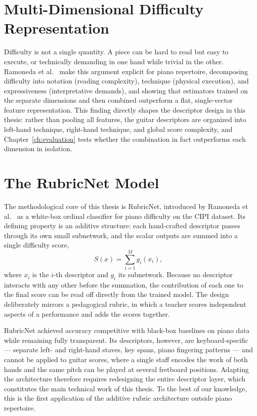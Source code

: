 \section{Multi-Dimensional Difficulty Representation}
Difficulty is not a single quantity. A piece can be hard to read but easy to execute, or technically demanding in one hand while trivial in the other. Ramoneda et al.~\cite{ramoneda2024combining} make this argument explicit for piano repertoire, decomposing difficulty into notation (reading complexity), technique (physical execution), and expressiveness (interpretative demands), and showing that estimators trained on the separate dimensions and then combined outperform a flat, single-vector feature representation. This finding directly shapes the descriptor design in this thesis: rather than pooling all features, the guitar descriptors are organized into left-hand technique, right-hand technique, and global score complexity, and Chapter~\ref{ch:evaluation} tests whether the combination in fact outperforms each dimension in isolation.

\section{The RubricNet Model}
The methodological core of this thesis is RubricNet, introduced by Ramoneda et al.~\cite{ramoneda2024rubricnet} as a white-box ordinal classifier for piano difficulty on the CIPI dataset. Its defining property is an additive structure: each hand-crafted descriptor passes through its own small subnetwork, and the scalar outputs are summed into a single difficulty score,
\begin{equation}
    S(x) = \sum_{i=1}^{M} g_i(x_i),
\end{equation}
where $x_i$ is the $i$-th descriptor and $g_i$ its subnetwork. Because no descriptor interacts with any other before the summation, the contribution of each one to the final score can be read off directly from the trained model. The design deliberately mirrors a pedagogical rubric, in which a teacher scores independent aspects of a performance and adds the scores together.

RubricNet achieved accuracy competitive with black-box baselines on piano data while remaining fully transparent. Its descriptors, however, are keyboard-specific --- separate left- and right-hand staves, key spans, piano fingering patterns --- and cannot be applied to guitar scores, where a single staff encodes the work of both hands and the same pitch can be played at several fretboard positions. Adapting the architecture therefore requires redesigning the entire descriptor layer, which constitutes the main technical work of this thesis. To the best of our knowledge, this is the first application of the additive rubric architecture outside piano repertoire.

